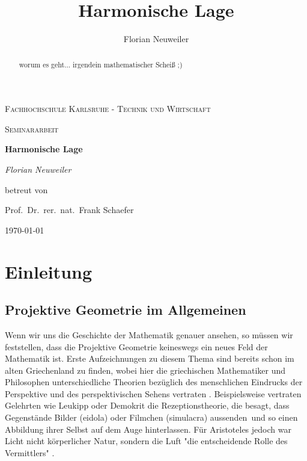 \documentclass[12pt,a4paper]{article}
\author{Florian Neuweiler}
\date{}
\title{Harmonische Lage}
\begin{document}

\setlength{\columnsep}{1.5cm}
\setlength{\columnseprule}{1pt}

\theoremstyle{definition}

\begin{titlepage}
\centering
{\scshape\LARGE Fachhochschule Karlsruhe - Technik und Wirtschaft \par}
\vspace{1cm}
{\scshape\Large Seminararbeit\par}
\vspace{1.5cm}
{\huge\bfseries Harmonische Lage\par}
\vspace{1.5cm}
{\Large\itshape Florian Neuweiler\par}
\vspace{1.5cm}
betreut von\par
Prof.~Dr.~rer.~nat.~Frank Schaefer
\vspace{2cm}

\begin{abstract} 
worum es geht... 
irgendein mathematischer Scheiß ;)
\end{abstract}

\vfill



{\large \today\par}
\end{titlepage}

\newpage
\tableofcontents

\newpage

\setlength{\parindent}{0pt}

\section{Einleitung}
\subsection{Projektive Geometrie im Allgemeinen} 
Wenn wir uns die Geschichte der Mathematik genauer ansehen, so müssen wir feststellen, dass die Projektive Geometrie keineswegs ein neues Feld der Mathematik ist. Erste Aufzeichnungen zu diesem Thema sind bereits schon im alten Griechenland zu finden, wobei hier die griechischen Mathematiker und Philosophen unterschiedliche Theorien bezüglich des menschlichen Eindrucks der Perspektive und des perspektivischen Sehens vertraten \citep[vgl.][S.~15ff]{perspektive}. Beispielsweise vertraten Gelehrten wie Leukipp oder Demokrit die Rezeptionstheorie, die besagt, \glqq dass Gegenstände Bilder (eidola) oder Filmchen (simulacra) aussenden\grqq ~und so einen Abbildung ihrer Selbst auf dem Auge hinterlassen. Für Aristoteles jedoch war Licht nicht körperlicher Natur, sondern die Luft "die entscheidende Rolle des Vermittlers" \citep[s.][S.~15f]{perspektive}.
\end{document}
